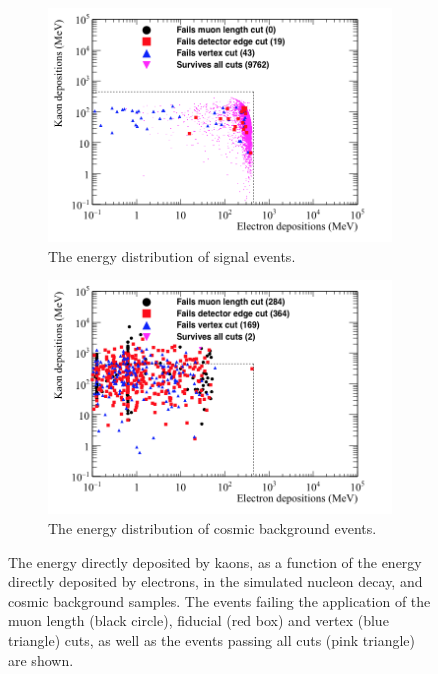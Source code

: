 \begin{figure}
  \centering
  \begin{subfigure}{0.8\textwidth}
    \includegraphics[width=\textwidth]{NucleonDecay_Kaon_vs_Elec_Can}
    \caption{The energy distribution of signal events.}
    \label{fig:NDK_Kaon_Elec_EDist_Sig}
  \end{subfigure}
  \begin{subfigure}{0.8\textwidth}
    \includegraphics[width=\textwidth]{CosmicBackground_Kaon_vs_Elec_Can}
    \caption{The energy distribution of cosmic background events.}
    \label{fig:NDK_Kaon_Elec_EDist_Cosmo}
  \end{subfigure}
  \caption[The energy directly deposited by kaons, as a function of the energy directly deposited by electrons, in the simulated nucleon decay, and cosmic background samples]
          {The energy directly deposited by kaons, as a function of the energy directly deposited by electrons, in the simulated nucleon decay, and cosmic background samples. The events failing the application of the muon length (black circle), fiducial (red box) and vertex (blue triangle) cuts, as well as the events passing all cuts (pink triangle) are shown.}
  \label{fig:NDK_Kaon_Elec_EDist}
\end{figure}

